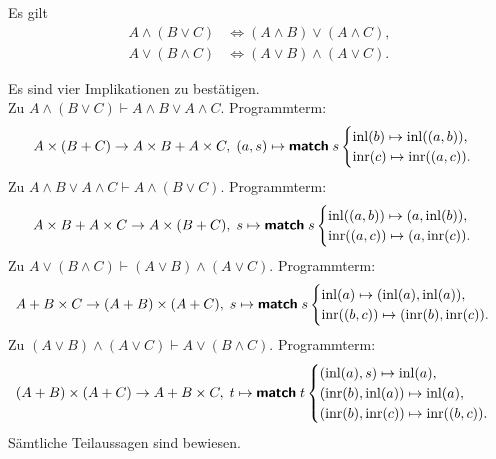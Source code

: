 \begin{Satz}[Distributivgesetze]%
\label{bool-dl}
Es gilt
\begin{align*}
A\land (B\lor C) &\iff (A\land B)\lor (A\land C),\\
A\lor (B\land C) &\iff (A\lor B)\land (A\lor C).
\end{align*}
\end{Satz}
\begin{Beweis} Es sind vier Implikationen zu bestätigen.\\
Zu $A\land (B\lor C) \vdash A\land B\lor A\land C$.
Programmterm:
\[A\times (B+C) \to A\times B + A\times C,\; (a, s)\mapsto \text{{\normalfont\sffamily\bfseries match}}\; s \begin{cases}
\operatorname{inl}(b)\mapsto \operatorname{inl}((a,b)),\\
\operatorname{inr}(c)\mapsto \operatorname{inr}((a,c)).
\end{cases}\]
Zu $A\land B\lor A\land C\vdash A\land (B\lor C)$.
Programmterm:
\[A\times B + A\times C\to A\times (B + C),\;
s\mapsto\text{{\normalfont\sffamily\bfseries match}}\; s\begin{cases}
\operatorname{inl}((a,b))\mapsto (a, \operatorname{inl}(b)),\\
\operatorname{inr}((a,c))\mapsto (a, \operatorname{inr}(c)).
\end{cases}
\]
Zu $A\lor (B\land C) \vdash (A\lor B)\land (A\lor C)$. Programmterm:
\[A+B\times C\to (A+B)\times (A+C),\;
s\mapsto\text{{\normalfont\sffamily\bfseries match}}\; s\begin{cases}
\operatorname{inl}(a)\mapsto (\operatorname{inl}(a),\operatorname{inl}(a)),\\
\operatorname{inr}((b,c))\mapsto (\operatorname{inr}(b),\operatorname{inr}(c)).
\end{cases} 
\]
Zu $(A\lor B)\land (A\lor C)\vdash A\lor (B\land C)$. Programmterm:
\[
(A+B)\times (A+C)\to A + B\times C,\;
t\mapsto\text{{\normalfont\sffamily\bfseries match}}\; t\begin{cases}
(\operatorname{inl}(a), s) \mapsto\operatorname{inl}(a),\\
(\operatorname{inr}(b), \operatorname{inl}(a)) \mapsto\operatorname{inl}(a),\\
(\operatorname{inr}(b), \operatorname{inr}(c)) \mapsto\operatorname{inr}((b, c)).
\end{cases}
\]
Sämtliche Teilaussagen sind bewiesen.\;\qedsymbol
\end{Beweis}

